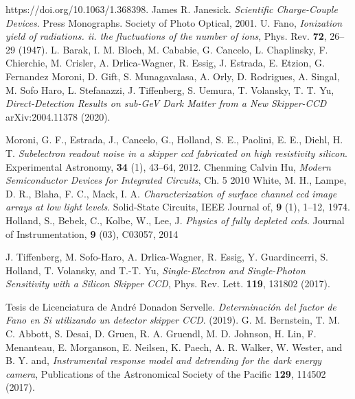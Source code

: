 \documentclass[a4paper,12pt]{report}
\begin{document}
\begin{thebibliography}{99}
https://doi.org/10.1063/1.368398.
James R. Janesick. \textit{Scientific Charge-Couple Devices}. Press Monographs. Society of Photo Optical, 2001.
U. Fano, \textit{Ionization yield of radiations. ii. the fluctuations of the number of ions}, Phys. Rev. \textbf{72}, 26–29 (1947).
L. Barak, I. M. Bloch, M. Cababie, G. Cancelo, L. Chaplinsky, F. Chierchie, M. Crisler, A. Drlica-Wagner, R. Essig, J. Estrada, E. Etzion, G. Fernandez Moroni, D. Gift, S. Munagavalasa, A. Orly, D. Rodrigues, A. Singal, M. Sofo Haro, L. Stefanazzi, J. Tiffenberg, S. Uemura, T. Volansky, T. T. Yu, \textit{Direct-Detection Results on sub-GeV Dark Matter from a New Skipper-CCD} arXiv:2004.11378 (2020).

Moroni, G. F., Estrada, J., Cancelo, G., Holland, S. E., Paolini, E. E., Diehl, H. T. \textit{Subelectron readout noise in a skipper ccd fabricated on high resistivity silicon}. Experimental Astronomy, \textbf{34} (1), 43–64, 2012.
Chenming Calvin Hu, \textit{Modern Semiconductor Devices for Integrated Circuits}, Ch. 5 2010
White, M. H., Lampe, D. R., Blaha, F. C., Mack, I. A. \textit{Characterization of surface channel ccd image arrays at low light levels}. Solid-State Circuits, IEEE Journal of, \textbf{9} (1), 1–12, 1974.
Holland, S., Bebek, C., Kolbe, W., Lee, J. \textit{Physics of fully depleted ccds}. Journal of Instrumentation, \textbf{9} (03), C03057, 2014

J. Tiffenberg, M. Sofo-Haro, A. Drlica-Wagner, R. Essig, Y. Guardincerri, S. Holland, T. Volansky, and T.-T. Yu, \textit{Single-Electron and Single-Photon Sensitivity with a Silicon Skipper CCD}, Phys. Rev. Lett. \textbf{119}, 131802 (2017).

Tesis de Licenciatura de André Donadon Servelle. \textit{Determinación del factor de Fano en Si utilizando un detector skipper CCD}. (2019). 
G. M. Bernstein, T. M. C. Abbott, S. Desai, D. Gruen, R. A. Gruendl, M. D. Johnson, H. Lin, F. Menanteau, E. Morganson, E. Neilsen, K. Paech, A. R. Walker, W. Wester, and B. Y. and, \textit{Instrumental response model and detrending for the dark energy camera}, Publications of the Astronomical Society of the Pacific \textbf{129}, 114502 (2017).


\end{thebibliography}
\end{document}
